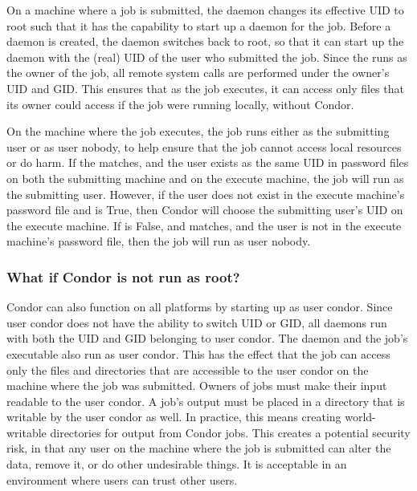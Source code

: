 On a machine where a job is submitted,
the  daemon
changes its effective UID to root
such that it has the capability to start up a  daemon
for the job.
Before a  daemon is created,
the  daemon
switches back to root,
so that it can start up the  daemon with the (real) UID
of the user who submitted the job.
Since the  runs as the owner of the job,
all remote system calls are performed under the owner's UID
and GID.
This ensures that as the job executes,
it can access only files that its owner could access if the job
were running locally, without Condor.

On the machine where the job executes, the 
job runs either as the submitting user or as user nobody,
to help ensure that the job cannot access local resources or do harm.  
If the  matches,
and the user exists as the same UID in password files
on both the submitting machine and on the execute machine,
the job will run as the submitting user.
However, if the user does not exist in the execute machine's
password file and  is True,
then Condor will choose the submitting user's UID on the
execute machine.
If  is False,
and  matches,
and the user is not in the execute machine's password file,
then the job will run as user nobody.

\subsubsection{\label{sec:norootaccess}What if Condor is not run as root?}

Condor can also function on all platforms by starting up as
user condor.  Since user condor does not have the ability to switch
UID or GID, all daemons run with both the UID and GID belonging
to user condor.
The  daemon and the job's executable also
run as user condor.
This has the effect that
the job can access only the files and directories that are
accessible to the user condor on the machine where the job
was submitted.
Owners of
jobs must make their input readable to the user condor.
A job's output must be placed in a directory that is writable by
the user condor as well.
In practice, this means creating
world-writable directories for output from Condor jobs.
This creates a potential security risk,
in that any user on the machine where the job is submitted
can alter the data, remove it, or do other undesirable things.
It is acceptable in an environment where users can trust other users.

